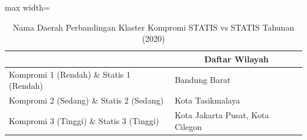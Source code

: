 \begin{table}[H]
\centering
\caption{Nama Daerah Perbandingan Klaster Kompromi STATIS vs STATIS Tahunan (2020)} \label{tab:sample2comp_statis_name_2020}
\begin{adjustbox}{max width=\textwidth}
\begin{tabular}{|>{\centering\arraybackslash}p{4cm}|p{10cm}|}
\hline
\multicolumn{1}{|c|}{\textbf{Kategori}} & \multicolumn{1}{c|}{\textbf{Daftar Wilayah}} \\
\hline
Kompromi 1 (Rendah) \& Statis 1 (Rendah) & Bandung Barat \\
\hline
Kompromi 2 (Sedang) \& Statis 2 (Sedang) & Kota Tasikmalaya \\
\hline
Kompromi 3 (Tinggi) \& Statis 3 (Tinggi) & Kota Jakarta Pusat, Kota Cilegon \\
\hline
\end{tabular}
\end{adjustbox}
\end{table}